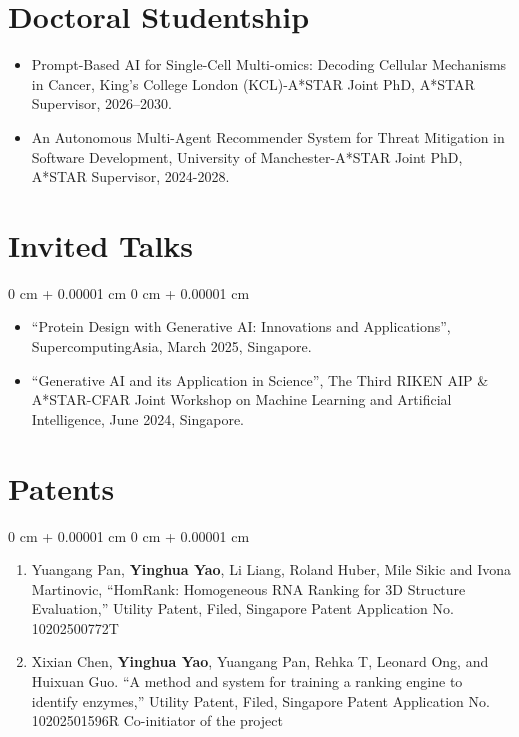 \documentclass[10pt, letterpaper]{article}
\newenvironment{highlights}{
    \begin{itemize}[
        topsep=0.10 cm,
        parsep=0.10 cm,
        partopsep=0pt,
        itemsep=0pt,
        leftmargin=0 cm + 10pt
    ]
}{
    \end{itemize}
} %
\newenvironment{enum}{
    \begin{enumerate}[
        topsep=0.10 cm,
        parsep=0.10 cm,
        partopsep=0pt,
        itemsep=0pt,
        leftmargin=0 cm + 12pt
    ]
}{
    \end{enumerate}
} %
\newenvironment{onecolentry}{
    \begin{adjustwidth}{
        0 cm + 0.00001 cm
    }{
        0 cm + 0.00001 cm
    }
}{
    \end{adjustwidth}
} %
\begin{document}
\section{Doctoral Studentship}
\begin{highlights}
    \item Prompt-Based AI for Single-Cell Multi-omics: Decoding Cellular Mechanisms in Cancer, King's College London (KCL)-A*STAR Joint PhD, A*STAR Supervisor, 2026–2030. 
    \item An Autonomous Multi-Agent Recommender System for Threat Mitigation in Software Development, University of Manchester-A*STAR Joint PhD, A*STAR Supervisor, 2024-2028.
\end{highlights}

\section{Invited Talks}
    \begin{onecolentry}
        \begin{highlights}
            \item ``Protein Design with Generative AI: Innovations and Applications'', SupercomputingAsia, March 2025, Singapore.
            \item ``Generative AI and its Application in Science'', The Third RIKEN AIP \& A*STAR-CFAR Joint Workshop on Machine Learning and Artificial Intelligence, June 2024, Singapore.
        \end{highlights}
    \end{onecolentry}


\section{Patents}
    \begin{onecolentry}
        \begin{enum}
            \item Yuangang Pan, \textbf{Yinghua Yao}, Li Liang, Roland Huber, Mile Sikic and Ivona Martinovic, ``HomRank: Homogeneous RNA Ranking for 3D Structure Evaluation,'' Utility Patent, Filed, Singapore Patent Application No. 10202500772T
            \item Xixian Chen, \textbf{Yinghua Yao}, Yuangang Pan, Rehka T, Leonard Ong, and Huixuan Guo. ``A method and system for training a ranking engine to identify enzymes,'' Utility Patent, Filed, Singapore Patent Application No. 10202501596R {\color{deeppink} Co-initiator of the project}
        \end{enum}  
    \end{onecolentry}
\end{document}
